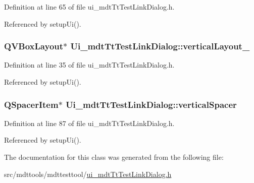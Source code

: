 Definition at line 65 of file ui\-\_\-mdt\-Tt\-Test\-Link\-Dialog.\-h.



Referenced by setup\-Ui().

\hypertarget{class_ui__mdt_tt_test_link_dialog_afca158adb2b606da330ee1f2621e6e92}{
\subsubsection[{vertical\-Layout\-\_\-3}]{\setlength{\rightskip}{0pt plus 5cm}Q\-V\-Box\-Layout$\ast$ Ui\-\_\-mdt\-Tt\-Test\-Link\-Dialog\-::vertical\-Layout\-\_}}\label{class_ui__mdt_tt_test_link_dialog_afca158adb2b606da330ee1f2621e6e92}


Definition at line 35 of file ui\-\_\-mdt\-Tt\-Test\-Link\-Dialog.\-h.



Referenced by setup\-Ui().

\hypertarget{class_ui__mdt_tt_test_link_dialog_ab2f6a471c879b10399902fc067128b93}{
\subsubsection[{vertical\-Spacer}]{\setlength{\rightskip}{0pt plus 5cm}Q\-Spacer\-Item$\ast$ Ui\-\_\-mdt\-Tt\-Test\-Link\-Dialog\-::vertical\-Spacer}}\label{class_ui__mdt_tt_test_link_dialog_ab2f6a471c879b10399902fc067128b93}


Definition at line 87 of file ui\-\_\-mdt\-Tt\-Test\-Link\-Dialog.\-h.



Referenced by setup\-Ui().



The documentation for this class was generated from the following file\-:\begin{DoxyCompactItemize}
\item 
src/mdttools/mdttesttool/\hyperlink{ui__mdt_tt_test_link_dialog_8h}{ui\-\_\-mdt\-Tt\-Test\-Link\-Dialog.\-h}\end{DoxyCompactItemize}
